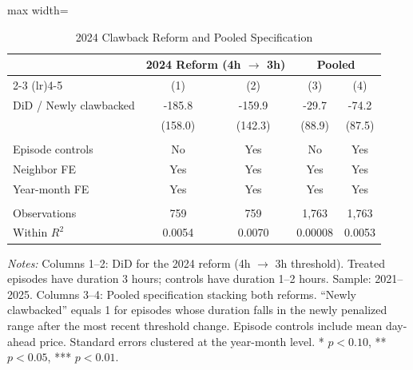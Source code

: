 \begin{table}[H]
\centering
\caption{2024 Clawback Reform and Pooled Specification}
\begin{threeparttable}
\begin{adjustbox}{max width=\textwidth}
\begin{tabular}{lcccc}
\toprule
& \multicolumn{2}{c}{2024 Reform (4h $\to$ 3h)} & \multicolumn{2}{c}{Pooled} \\
\cmidrule(lr){2-3} \cmidrule(lr){4-5}
& (1) & (2) & (3) & (4) \\
\midrule
DiD / Newly clawbacked & -185.8 & -159.9 & -29.7 & -74.2 \\
                       & (158.0) & (142.3) & (88.9) & (87.5) \\
\\
Episode controls & No & Yes & No & Yes \\
Neighbor FE & Yes & Yes & Yes & Yes \\
Year-month FE & Yes & Yes & Yes & Yes \\
\\
Observations & 759 & 759 & 1,763 & 1,763 \\
Within $R^2$ & 0.0054 & 0.0070 & 0.00008 & 0.0053 \\
\bottomrule
\end{tabular}
\end{adjustbox}
\begin{tablenotes}[flushleft]
\small
\item \textit{Notes:} Columns 1--2: DiD for the 2024 reform (4h $\to$ 3h threshold). Treated episodes have duration 3 hours; controls have duration 1--2 hours. Sample: 2021--2025. Columns 3--4: Pooled specification stacking both reforms. ``Newly clawbacked'' equals 1 for episodes whose duration falls in the newly penalized range after the most recent threshold change. Episode controls include mean day-ahead price. Standard errors clustered at the year-month level. * $p<0.10$, ** $p<0.05$, *** $p<0.01$.
\end{tablenotes}
\end{threeparttable}
\label{tab:reform2024}
\end{table}
